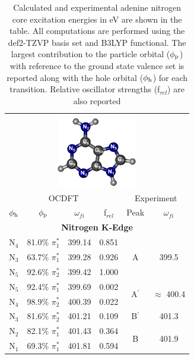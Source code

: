 \documentclass[12pt]{article}
\begin{document}
 \begin{table}[!ht]
 \footnotesize
\caption{Calculated and experimental adenine nitrogen core excitation energies in eV are shown in the table. All computations are performed using the def2-TZVP basis set and B3LYP functional. The largest contribution to the particle orbital ($\phi_{\rm p}$) with reference to the ground state valence set is reported along with the hole orbital ($\phi_{\rm h}$) for each transition. Relative oscillator strengths (f$_{rel}$) are also reported}
 \centering
     \begin{tabular*}{8.5cm}{@{\extracolsep{\fill} }cccccc}
     \hline\hline\\[-8pt]
     \multicolumn{6}{c}{
 \includegraphics[width=3.5cm]{AdenineNumbering.png}}\\
     \hline
   \multicolumn{4}{c}{OCDFT} &\multicolumn{2}{c}{Experiment} \\
 $\phi_{\rm h}$ &  $\phi_{\rm p}$ & $\omega_{fi}$ & f$_{rel}$ & Peak &  $\omega_{fi}$   \\[1pt]
   \hline
    \multicolumn{6}{c}{\textbf{Nitrogen K-Edge}} \vspace{0.05in}\\
    N$_4$
 &   81.0$\%$ $\pi_1^*$  & 399.14 & 0.851 & \multirow{3}{*}{A} & \multirow{3}{*}{399.5} \\
    N$_3$
 &   63.7$\%$ $\pi_1^*$  & 399.28 & 0.926 \\
    N$_5$
 &   92.6$\%$ $\pi_2^*$  & 399.42 & 1.000 
\vspace{0.05in}\\
    N$_5$
 &   92.4$\%$ $\pi_1^*$  & 399.69 & 0.002 & \multirow{2}{*}{A$^{\prime}$} & \multirow{2}{*}{$\approx$ 400.4}  \\
    N$_4$
 &   98.9$\%$ $\pi_2^*$
 & 400.39 & 0.022 
 \vspace{0.05in}\\
    N$_3$
 &   81.6$\%$ $\pi_2^*$  & 401.21 & 0.109 & B$^{\prime}$ & 401.3 
 \vspace{0.05in}\\
    N$_2$
 &   82.1$\%$ $\pi_1^*$  & 401.43 & 0.364 & \multirow{3}{*}{B} & \multirow{3}{*}{401.9}\\
    N$_1$
 &   69.3$\%$ $\pi_1^*$  & 401.81 & 0.594 \\

\end{tabular*}
\end{table}
\end{document}
